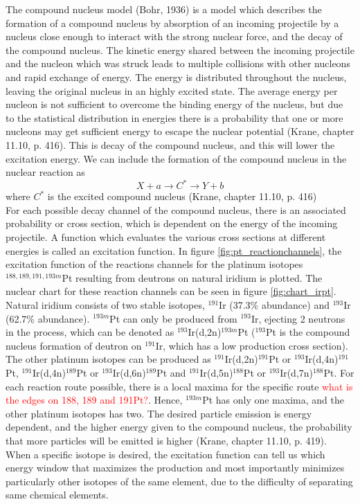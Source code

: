 \documentclass[a4paper,11pt,twoside]{book}
\begin{document}
\noindent The compound nucleus model (Bohr, 1936) is a model which describes the formation of a compound nucleus by absorption of an incoming projectile by a nucleus close enough to interact with the strong nuclear force, and the decay of the compound nucleus. The kinetic energy shared between the incoming projectile and the nucleon which was struck leads to multiple collisions with other nucleons and rapid exchange of energy. The energy is distributed throughout the nucleus, leaving the original nucleus in an highly excited state. The average energy per nucleon is not sufficient to overcome the binding energy of the nucleus, but due to the statistical distribution in energies there is a probability that one or more nucleons may get sufficient energy to escape the nuclear potential (Krane, chapter 11.10, p. 416). This is decay of the compound nucleus, and this will lower the excitation energy. We can include the formation of the compound nucleus in the nuclear reaction as \begin{equation}
    X + a \rightarrow C^* \rightarrow Y + b
\end{equation} where $C^*$ is the excited compound nucleus (Krane, chapter 11.10, p. 416)  \\

\noindent For each possible decay channel of the compound nucleus, there is an associated probability or cross section, which is dependent on the energy of the incoming projectile. A function which evaluates the various cross sections at different energies is called an excitation function. In figure \ref{fig:pt_reactionchannels}, the excitation function of the reactions channels for the platinum isotopes $^{188, 189, 191,193m}$Pt resulting from deutrons on natural iridium is plotted. The nuclear chart for these reaction channels can be seen in figure \ref{fig:chart_irpt}. Natural iridium consists of two stable isotopes, $^{191}$Ir (37.3\% abundance) and $^{193}$Ir (62.7\% abundance). $^{193m}$Pt can only be produced from $^{193}$Ir, ejecting 2 neutrons in the process, which can be denoted as $^{193}$Ir(d,2n)$^{193m}$Pt ($^{193}$Pt is the compound nucleus formation of deutron on $^{191}$Ir, which has a low production cross section). The other platinum isotopes can be produced as $^{191}$Ir(d,2n)$^{191}$Pt or $^{193}$Ir(d,4n)$^{191}$Pt, $^{191}$Ir(d,4n)$^{189}$Pt or $^{193}$Ir(d,6n)$^{189}$Pt and $^{191}$Ir(d,5n)$^{188}$Pt or $^{193}$Ir(d,7n)$^{188}$Pt. For each reaction route possible, there is a local maxima for the specific route \textcolor{red}{what is the edges on 188, 189 and 191Pt?}. Hence, $^{193m}$Pt has only one maxima, and the other platinum isotopes has two. The desired particle emission is energy dependent, and the higher energy given to the compound nucleus, the probability that more particles will be emitted is higher (Krane, chapter 11.10, p. 419). When a specific isotope is desired, the excitation function can tell us which energy window that maximizes the production and most importantly minimizes particularly other isotopes of the same element, due to the difficulty of separating same chemical elements. \\
\end{document}

